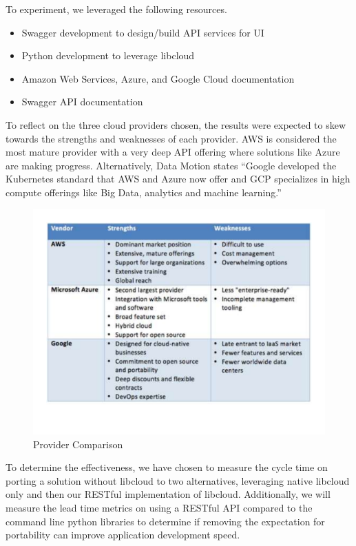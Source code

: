 To experiment, we leveraged the following resources.

\begin{itemize}

\item Swagger development to design/build API services for UI
\item Python development to leverage libcloud
\item Amazon Web Services, Azure, and Google Cloud documentation
\item Swagger API documentation
 
\end{itemize}


To reflect on the three cloud providers chosen, the results were expected to
skew towards the strengths and weaknesses of each provider. AWS is considered
the most mature provider with a very deep API offering where solutions like
Azure are making progress. Alternatively, Data Motion states ``Google developed
the Kubernetes standard that AWS and Azure now offer and GCP specializes in high
compute offerings like Big Data, analytics and machine
learning.''\cite{hid-sp18-518-DataMotion}

\begin{figure}[!ht]
  \centering
  \includegraphics[width=\columnwidth]{images/aws-azure-google.pdf}
  \caption{Provider Comparison}\label{F:comparison}
\end{figure}

To determine the effectiveness, we have chosen to measure the cycle time on
porting a solution without libcloud to two alternatives, leveraging native
libcloud only and then our RESTful implementation of libcloud. Additionally, we
will measure the lead time metrics on using a RESTful API compared to the
command line python libraries to determine if removing the expectation for
portability can improve application development speed.

